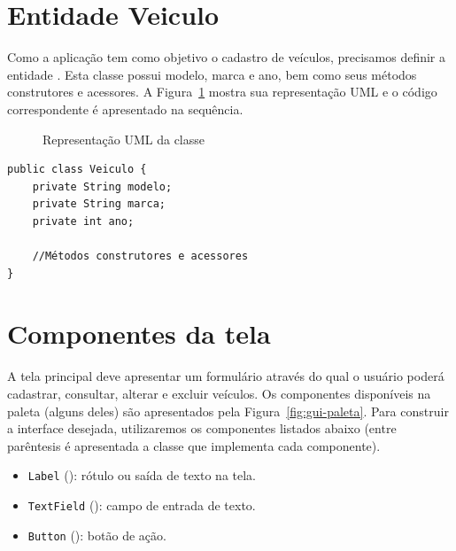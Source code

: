\section{Entidade Veiculo}

Como a aplicação tem como objetivo o cadastro de veículos, precisamos definir a entidade . Esta classe possui modelo, marca e ano, bem como seus métodos construtores e acessores. A Figura~\ref{fig:gui-veiculo} mostra sua representação UML e o código correspondente é apresentado na sequência.

\begin{figure}[h]
	\centering
	
	
	\caption{Representação UML da classe }
	\label{fig:gui-veiculo}
\end{figure}

\begin{verbatim}
public class Veiculo {
	private String modelo;
	private String marca;
	private int ano;
	
	//Métodos construtores e acessores
}
\end{verbatim}


\section{Componentes da tela}

A tela principal deve apresentar um formulário através do qual o usuário poderá cadastrar, consultar, alterar e excluir veículos. Os componentes disponíveis na paleta (alguns deles) são apresentados pela Figura~\ref{fig:gui-paleta}. Para construir a interface desejada, utilizaremos os componentes listados abaixo (entre parêntesis é apresentada a classe que implementa cada componente).

\begin{itemize}
	\item \texttt{Label} (): rótulo ou saída de texto na tela.
	\item \texttt{TextField} (): campo de entrada de texto.
	\item \texttt{Button} (): botão de ação.
\end{itemize}

